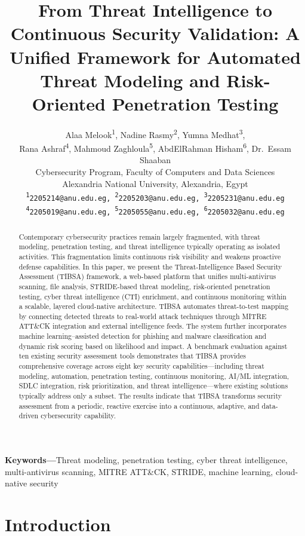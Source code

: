 \documentclass[12pt, a4paper]{article}
\title{\textbf{\Large From Threat Intelligence to Continuous Security Validation: A Unified Framework for Automated Threat Modeling and Risk-Oriented Penetration Testing}}
\author{
    Alaa Melook\textsuperscript{1},
    Nadine Rasmy\textsuperscript{2},
    Yumna Medhat\textsuperscript{3},\\
    Rana Ashraf\textsuperscript{4},
    Mahmoud Zaghloula\textsuperscript{5},
    AbdElRahman Hisham\textsuperscript{6},
    Dr.~Essam Shaaban\\[6pt]
    Cybersecurity Program, Faculty of Computers and Data Sciences\\
    Alexandria National University, Alexandria, Egypt\\[4pt]
    {\small\texttt{\textsuperscript{1}2205214@anu.edu.eg,\quad
    \textsuperscript{2}2205203@anu.edu.eg,\quad
    \textsuperscript{3}2205231@anu.edu.eg}}\\
    {\small\texttt{\textsuperscript{4}2205019@anu.edu.eg,\quad
    \textsuperscript{5}2205055@anu.edu.eg,\quad
    \textsuperscript{6}2205032@anu.edu.eg}}
}
\date{}
\begin{document}
\maketitle
\thispagestyle{fancy}

\begin{abstract}
Contemporary cybersecurity practices remain largely fragmented, with threat modeling, penetration testing, and threat intelligence typically operating as isolated activities. This fragmentation limits continuous risk visibility and weakens proactive defense capabilities. In this paper, we present the Threat-Intelligence Based Security Assessment (TIBSA) framework, a web-based platform that unifies multi-antivirus scanning, file analysis, STRIDE-based threat modeling, risk-oriented penetration testing, cyber threat intelligence (CTI) enrichment, and continuous monitoring within a scalable, layered cloud-native architecture. TIBSA automates threat-to-test mapping by connecting detected threats to real-world attack techniques through MITRE ATT\&CK integration and external intelligence feeds. The system further incorporates machine learning--assisted detection for phishing and malware classification and dynamic risk scoring based on likelihood and impact. A benchmark evaluation against ten existing security assessment tools demonstrates that TIBSA provides comprehensive coverage across eight key security capabilities---including threat modeling, automation, penetration testing, continuous monitoring, AI/ML integration, SDLC integration, risk prioritization, and threat intelligence---where existing solutions typically address only a subset. The results indicate that TIBSA transforms security assessment from a periodic, reactive exercise into a continuous, adaptive, and data-driven cybersecurity capability.
\end{abstract}

\noindent\textbf{Keywords---}Threat modeling, penetration testing, cyber threat intelligence, multi-antivirus scanning, MITRE ATT\&CK, STRIDE, machine learning, cloud-native security

\section{Introduction}
\end{document}
